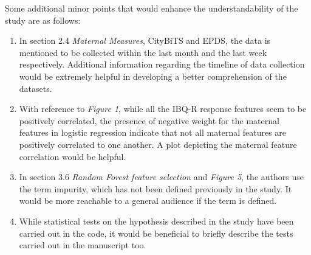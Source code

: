\documentclass{article}
\begin{document}
\noindent
Some additional minor points that would enhance the understandability of the study are as follows:
\begin{enumerate}
	\itemsep0em
	\item In section 2.4 \textit{Maternal Measures}, CityBiTS and EPDS, the data is mentioned to be collected within the last month and the last week respectively. Additional information regarding the timeline of data collection would be extremely helpful in developing a better comprehension of the datasets. 
	\item With reference to \textit{Figure 1}, while all the IBQ-R response features seem to be positively correlated, the presence of negative weight for the maternal features in logistic regression indicate that not all maternal features are positively correlated to one another. A plot depicting the maternal feature correlation would be helpful.
	\item In section 3.6 \textit{Random Forest feature selection} and \textit{Figure 5}, the authors use the term impurity, which has not been defined previously in the study. It would be more reachable to a general audience if the term is defined.
	\item While statistical tests on the hypothesis described in the study have been carried out in the code, it would be beneficial to briefly describe the tests carried out in the manuscript too.
\end{enumerate}
\end{document}
